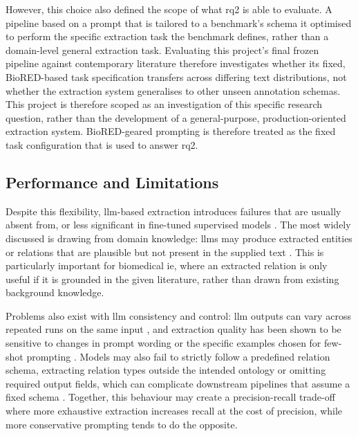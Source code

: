 However, this choice also defined the scope of what \gls{rq2} is able to evaluate. A pipeline based on a prompt that is tailored to a benchmark's schema it optimised to perform the specific extraction task the benchmark defines, rather than a domain-level general extraction task. Evaluating this project's final frozen pipeline against contemporary literature therefore investigates whether its fixed, BioRED-based task specification transfers across differing text distributions, not whether the extraction system generalises to other unseen annotation schemas. This project is therefore scoped as an investigation of this specific research question, rather than the development of a general-purpose, production-oriented extraction system. BioRED-geared prompting is therefore treated as the fixed task configuration that is used to answer \gls{rq2}.

\subsection{Performance and Limitations}
\label{subsec:lit:performance_and_limitations}
Despite this flexibility, \gls{llm}-based extraction introduces failures that are usually absent from, or less significant in fine-tuned supervised models \pref. The most widely discussed is drawing from domain knowledge: \glspl{llm} may produce extracted entities or relations that are plausible but not present in the supplied text \cite{brokman2025benchmark}. This is particularly important for biomedical \gls{ie}, where an extracted relation is only useful if it is grounded in the given literature, rather than drawn from existing background knowledge.

Problems also exist with \gls{llm} consistency and control: \gls{llm} outputs can vary across repeated runs on the same input \cite{labonte2026structured}, and extraction quality has been shown to be sensitive to changes in prompt wording or the specific examples chosen for few-shot prompting \cite{zhang2024study,ge2026improving}. Models may also fail to strictly follow a predefined relation schema, extracting relation types outside the intended ontology or omitting required output fields, which can complicate downstream pipelines that assume a fixed schema \cite{labonte2026structured}. Together, this behaviour may create a precision-recall trade-off where more exhaustive extraction increases recall at the cost of precision, while more conservative prompting tends to do the opposite.


